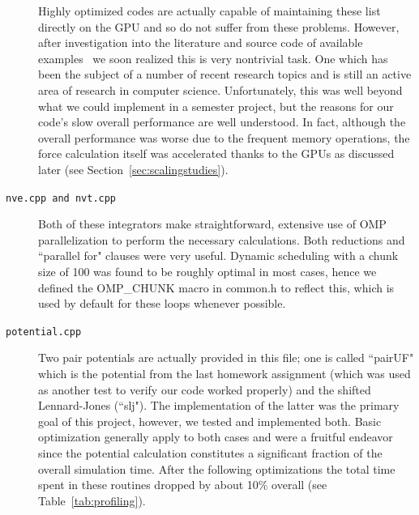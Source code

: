 \documentclass[12pt]{article}
\begin{document}
\begin{description}
Highly optimized codes are actually capable of maintaining these list directly on the GPU and so do not suffer from these problems.  However, after investigation into the literature and source code of available examples~\cite{Anderson2008, Lipscomb2012} we soon realized this is very nontrivial task. One which has been the subject of a number of recent research topics and is still an active area of research in computer science.  Unfortunately, this was well beyond what we could implement in a semester project, but the reasons for our code's slow overall performance are well understood.  In fact, although the overall performance was worse due to the frequent memory operations, the force calculation itself was accelerated thanks to the GPUs as discussed later (see Section~\ref{sec:scalingstudies}).


\item[\texttt{nve.cpp and nvt.cpp}] 
Both of these integrators make straightforward, extensive use of OMP parallelization to perform the necessary calculations.  Both reductions and ``parallel for" clauses were very useful.  Dynamic scheduling with a chunk size of 100 was found to be roughly optimal in most cases, hence we defined the OMP\_CHUNK macro in common.h to reflect this, which is used by default for these loops whenever possible.

\item[\texttt{potential.cpp}] 
Two pair potentials are actually provided in this file; one is called ``pairUF" which is the potential from the last homework assignment (which was used as another test to verify our code worked properly) and the shifted Lennard-Jones (``slj").  The implementation of the latter was the primary goal of this project, however, we tested and implemented both.  Basic optimization generally apply to both cases and were a fruitful endeavor since the potential calculation constitutes a significant fraction of the overall simulation time.  After the following optimizations the total time spent in these routines dropped by about 10\% overall (see Table~\ref{tab:profiling}).  


\end{description}
\end{document}
